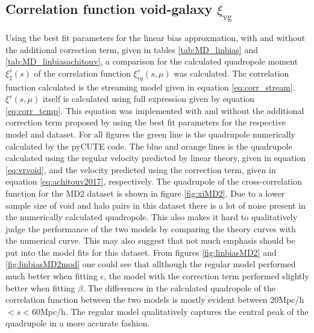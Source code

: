 \subsection{Correlation function void-galaxy $\xi_{\mathrm{vg}}$}
Using the best fit parameters for the linear bias approxmation, with and without the additional correction term, given in tables \ref{tab:MD_linbias} and \ref{tab:MD_linbiasachitouv}, a comparison for the calculated quadropole moment $\xi_2^s(s)$ of the correlation function $\xi_{vg}^s(s,\mu)$ was calculated. The correlation function calculated is the streaming model given in equation \ref{eq:corr_stream}. $\xi^s(s,\mu)$ itself is calculated using full expression given by equation \ref{eq:corr_temp}. This equation was implemented with and without the additional correction term proposed by \cite{Achitouv_streaming} using the best fit parameters for the respective model and dataset. For all figures the green line is the quadrupole numerically calculated by the pyCUTE code. The blue and orange lines is the quadrupole calculated using the regular velocity predicted by linear theory, given in equation \ref{eq:vrvoid}, and the velocity predicted using the correction term, given in equation \ref{eq:achitouv2017}, respectively. The quadrupole of the cross-correlation function for the MD2 dataset is shown in figure \ref{fig:xiMD2}. Due to a lower sample size of void and halo pairs in this dataset there is a lot of noise present in the numerically calculated quadropole. This also makes it hard to qualitatively judge the performance of the two models by comparing the theory curves with the numerical curve. This may also suggest that not much emphasis should be put into the model fits for this dataset. From figures \ref{fig:linbiasMD2} and \ref{fig:linbiasMD2mod} one could see that allthough the regular model performed much better when fitting $\epsilon$, the model with the correction term performed slightly better when fitting $\beta$. The differences in the calculated quadropole of the correlation function between the two models is mostly evident between $20$Mpc/h$<s<60$Mpc/h. The regular model qualitatively captures the central peak of the quadrupole in a more accurate fashion.\\\indent
